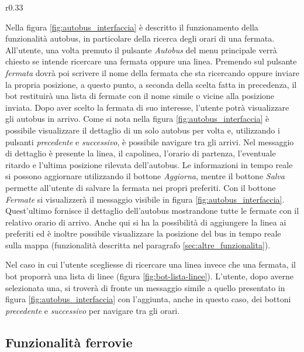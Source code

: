 \begin{wrapfigure}{r}{0.33\textwidth}
\centering
{}
\caption{Lista linee}
\label{fig:bot-lista-linee}
\end{wrapfigure}

Nella figura \ref{fig:autobus_interfaccia} è descritto il funzionamento della funzionalità autobus, in particolare della ricerca degli orari di una fermata. All'utente, una volta premuto il pulsante \textit{Autobus} del menu principale verrà chiesto se intende ricercare una fermata oppure una linea. Premendo sul pulsante \textit{fermata} dovrà poi scrivere il nome della fermata che sta ricercando oppure inviare la propria posizione, a questo punto, a seconda della scelta fatta in precedenza, il bot restituirà una lista di fermate con il nome simile o vicine alla posizione inviata. Dopo aver scelto la fermata di suo interesse, l'utente potrà visualizzare gli autobus in arrivo. Come si nota nella figura \ref{fig:autobus_interfaccia} è possibile visualizzare il dettaglio di un solo autobus per volta e, utilizzando i pulsanti \textit{precedente} e \textit{successivo}, è possibile navigare tra gli arrivi. Nel messaggio di dettaglio è presente la linea, il capolinea, l'orario di partenza, l'eventuale ritardo e l'ultima posizione rilevata dell'autobus. Le informazioni in tempo reale si possono aggiornare utilizzando il bottone \textit{Aggiorna}, mentre il bottone \textit{Salva} permette all'utente di salvare la fermata nei propri preferiti. Con il bottone \textit{Fermate} si visualizzerà il messaggio visibile in figura \ref{fig:autobus_interfaccia}. Quest'ultimo fornisce il dettaglio dell'autobus mostrandone tutte le fermate con il relativo orario di arrivo. Anche qui si ha la possibilità di aggiungere la linea ai preferiti ed è inoltre possibile visualizzare la posizione del bus in tempo reale sulla mappa (funzionalità descritta nel paragrafo \ref{sec:altre_funzionalita}).

Nel caso in cui l'utente scegliesse di ricercare una linea invece che una fermata, il bot proporrà una lista di linee (figura \ref{fig:bot-lista-linee}). L'utente, dopo averne selezionata una, si troverà di fronte un messaggio simile a quello presentato in figura \ref{fig:autobus_interfaccia} con l'aggiunta, anche in questo caso, dei bottoni \textit{precedente} e \textit{successivo} per navigare tra gli orari.

\subsection{Funzionalità ferrovie}

